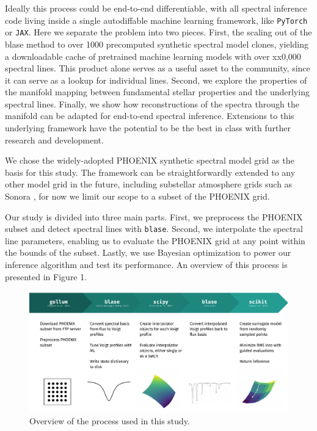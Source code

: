 \documentclass[twocolumn]{aastex631}
\begin{document}
Ideally this process could be end-to-end differentiable, with all spectral inference code living inside a single autodiffable machine learning framework, like \texttt{PyTorch} or \texttt{JAX}. Here we separate the problem into two pieces.  First, the scaling out of the blase method to over 1000 precomputed synthetic spectral model clones, yielding a downloadable cache of pretrained machine learning models with over xx0,000 spectral lines.  This product alone serves as a useful asset to the community, since it can serve as a lookup for individual lines. Second, we explore the properties of the manifold mapping between fundamental stellar properties and the underlying spectral lines.  Finally, we show how reconstructions of the spectra through the manifold can be adapted for end-to-end spectral inference.
Extensions to this underlying framework have the potential to be the best in class with further research and development.

We chose the widely-adopted PHOENIX synthetic spectral model grid  as the basis for this study. The framework can be straightforwardly extended to any other model grid in the future, including substellar atmosphere grids such as Sonora \citep{bobcat, cholla, diamondback, elfowl}, for now we limit our scope to a subset of the PHOENIX grid.

Our study is divided into three main parts. First, we preprocess the PHOENIX
subset and detect spectral lines with \texttt{blase}. Second, we interpolate
the spectral line parameters, enabling us to evaluate the PHOENIX grid at 
any point within the bounds of the subset. Lastly, we use Bayesian optimization to power our inference algorithm and test its performance. An overview of this process is presented in Figure 1.
\begin{figure}
    \centering
    \includegraphics[width=\textwidth]{figure1}
    \caption{Overview of the process used in this study.}
\end{figure}
\end{document}
